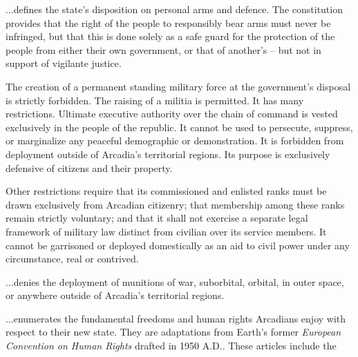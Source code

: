 \item %

...defines the state's disposition on personal arms and defence. The constitution provides that the right of the people to responsibly bear arms must never be infringed, but that this is done solely as a safe guard for the protection of the people from either their own government, or that of another's -- but not in support of vigilante justice.

The creation of a permanent standing military force at the government's disposal is strictly forbidden. The raising of a militia is permitted. It has many restrictions. Ultimate executive authority over the chain of command is vested exclusively in the people of the republic. It cannot be used to persecute, suppress, or marginalize any peaceful demographic or demonstration. It is forbidden from deployment outside of Arcadia's territorial regions. Its purpose is exclusively defensive of citizens and their property. 

Other restrictions require that its commissioned and enlisted ranks must be drawn exclusively from Arcadian citizenry; that membership among these ranks remain strictly voluntary; and that it shall not exercise a separate legal framework of military law distinct from civilian over its service members. It cannot be garrisoned or deployed domestically as an aid to civil power under any circumstance, real or contrived.

\page
\item %

...denies the deployment of munitions of war, suborbital, orbital, in outer space, or anywhere outside of Arcadia's territorial regions.
\stoparticle

\startarticle[start=11]
\item %

...enumerates the fundamental freedoms and human rights Arcadians enjoy with respect to their new state. They are adaptations from Earth's former {\it European Convention on Human Rights} drafted in 1950 A.D.. These articles include the

